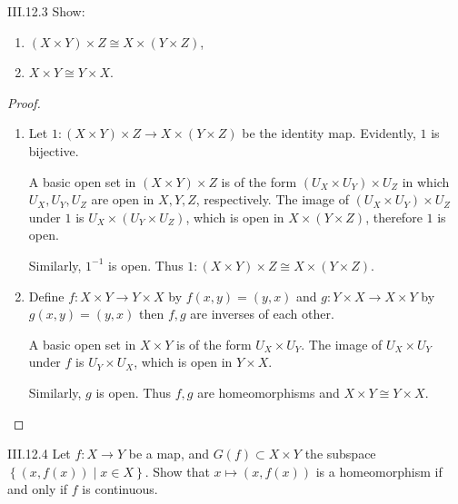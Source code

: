 \begin{problem}{III.12.3}
Show:
\begin{enumerate}[label={(\alph*)}]
	\item \( (X \times Y) \times Z \cong X \times (Y \times Z) \),
	\item \( X \times Y \cong Y \times X \).
\end{enumerate}
\end{problem}

\begin{proof}
	\begin{enumerate}[label={(\alph*)}]
		\item Let \( 1: (X \times Y) \times Z \to X \times (Y \times Z) \) be the identity map. Evidently, \( 1 \) is bijective.

		      A basic open set in \( (X \times Y) \times Z \) is of the form \( (U_{X} \times U_{Y}) \times U_{Z} \) in which \( U_{X}, U_{Y}, U_{Z} \) are open in \( X, Y, Z \), respectively. The image of \( (U_{X} \times U_{Y}) \times U_{Z} \) under \( 1 \) is \( U_{X} \times (U_{Y} \times U_{Z}) \), which is open in \( X \times (Y \times Z) \), therefore \( 1 \) is open.

		      Similarly, \( 1^{-1} \) is open. Thus \( 1: (X \times Y) \times Z \cong X \times (Y \times Z) \).
		\item Define \( f: X \times Y \to Y \times X \) by \( f(x, y) = (y, x) \) and \( g: Y \times X \to X \times Y \) by \( g(x, y) = (y, x) \) then \( f, g \) are inverses of each other.

		      A basic open set in \( X \times Y \) is of the form \( U_{X} \times U_{Y} \). The image of \( U_{X} \times U_{Y} \) under \( f \) is \( U_{Y} \times U_{X} \), which is open in \( Y \times X \).

		      Similarly, \( g \) is open. Thus \( f, g \) are homeomorphisms and \( X \times Y \cong Y \times X \).
	\end{enumerate}
\end{proof}

\begin{problem}{III.12.4}
Let \( f: X \to Y \) be a map, and \( G(f) \subset X \times Y \) the subspace \( \left\{ (x, f(x)) \mid x \in X \right\} \). Show that \( x \mapsto (x, f(x)) \) is a homeomorphism if and only if \(f\) is continuous.
\end{problem}

